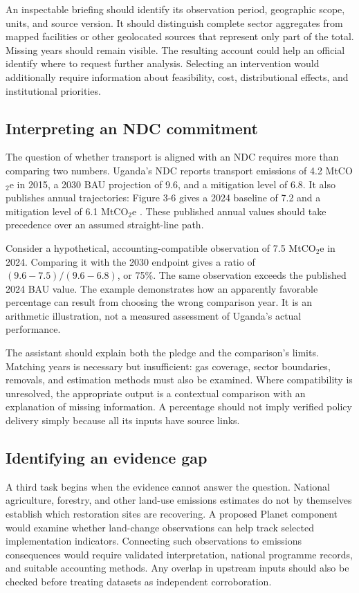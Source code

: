 \documentclass[11pt]{article}
\begin{document}
An inspectable briefing should identify its observation period, geographic scope, units, and source version. It should distinguish complete sector aggregates from mapped facilities or other geolocated sources that represent only part of the total. Missing years should remain visible. The resulting account could help an official identify where to request further analysis. Selecting an intervention would additionally require information about feasibility, cost, distributional effects, and institutional priorities.

\subsection*{Interpreting an NDC commitment}

The question of whether transport is aligned with an NDC requires more than comparing two numbers. Uganda's NDC reports transport emissions of 4.2 MtCO$_2$e in 2015, a 2030 BAU projection of 9.6, and a mitigation level of 6.8. It also publishes annual trajectories: Figure 3-6 gives a 2024 baseline of 7.2 and a mitigation level of 6.1 MtCO$_2$e \cite[printed p.~41]{uganda2022}. These published annual values should take precedence over an assumed straight-line path.

Consider a hypothetical, accounting-compatible observation of 7.5 MtCO$_2$e in 2024. Comparing it with the 2030 endpoint gives a ratio of $(9.6 - 7.5)/(9.6 - 6.8)$, or 75\%. The same observation exceeds the published 2024 BAU value. The example demonstrates how an apparently favorable percentage can result from choosing the wrong comparison year. It is an arithmetic illustration, not a measured assessment of Uganda's actual performance.

The assistant should explain both the pledge and the comparison's limits. Matching years is necessary but insufficient: gas coverage, sector boundaries, removals, and estimation methods must also be examined. Where compatibility is unresolved, the appropriate output is a contextual comparison with an explanation of missing information. A percentage should not imply verified policy delivery simply because all its inputs have source links.

\subsection*{Identifying an evidence gap}

A third task begins when the evidence cannot answer the question. National agriculture, forestry, and other land-use emissions estimates do not by themselves establish which restoration sites are recovering. A proposed Planet component would examine whether land-change observations can help track selected implementation indicators. Connecting such observations to emissions consequences would require validated interpretation, national programme records, and suitable accounting methods. Any overlap in upstream inputs should also be checked before treating datasets as independent corroboration.
\end{document}
